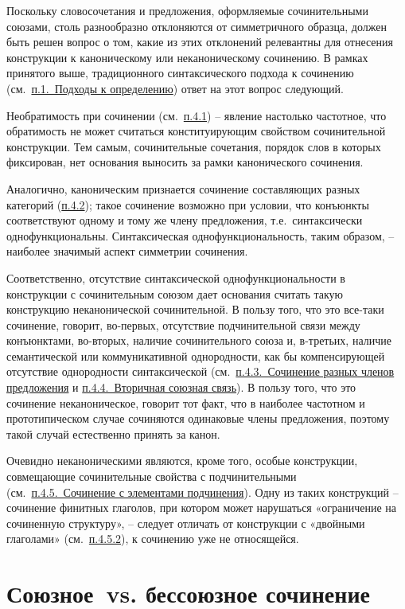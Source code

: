 Поскольку словосочетания и предложения, оформляемые сочинительными
союзами, столь разнообразно отклоняются от симметричного образца, должен
быть решен вопрос о том, какие из этих отклонений релевантны для
отнесения конструкции к каноническому или неканоническому сочинению. В
рамках принятого выше, традиционного синтаксического подхода к сочинению
(см.~\underline{п.1.~Подходы к определению}) ответ на этот вопрос
следующий.

Необратимость при сочинении (см.~\underline{п.4.1}) -- явление настолько
частотное, что обратимость не может считаться конституирующим свойством
сочинительной конструкции. Тем самым, сочинительные сочетания, порядок
слов в которых фиксирован, нет основания выносить за рамки канонического
сочинения.

Аналогично, каноническим признается сочинение составляющих разных
категорий (\underline{п.4.2}); такое сочинение возможно при условии, что
конъюнкты соответствуют одному и тому же члену предложения,
т.е.~синтаксически однофункциональны. Синтаксическая
однофункциональность, таким образом, -- наиболее значимый аспект
симметрии сочинения.

Соответственно, отсутствие синтаксической однофункциональности в
конструкции с сочинительным союзом дает основания считать такую
конструкцию неканонической сочинительной. В пользу того, что это
все-таки сочинение, говорит, во-первых, отсутствие подчинительной связи
между конъюнктами, во-вторых, наличие сочинительного союза и, в-третьих,
наличие семантической или коммуникативной однородности, как бы
компенсирующей отсутствие однородности синтаксической
(см.~\underline{п.4.3.~Сочинение разных членов предложения} и
\underline{п.4.4.~Вторичная союзная связь}). В пользу того, что это
сочинение неканоническое, говорит тот факт, что в наиболее частотном и
прототипическом случае сочиняются одинаковые члены предложения, поэтому
такой случай естественно принять за канон.

Очевидно неканоническими являются, кроме того, особые конструкции,
совмещающие сочинительные свойства с подчинительными
(см.~\underline{п.4.5.~Сочинение с элементами подчинения}). Одну из
таких конструкций -- сочинение финитных глаголов, при котором может
нарушаться «ограничение на сочиненную структуру», -- следует отличать от
конструкции с «двойными глаголами» (см.~\underline{п.4.5.2}), к
сочинению уже не относящейся.

\hypertarget{ux441ux43eux44eux437ux43dux43eux435-vs.-ux431ux435ux441ux441ux43eux44eux437ux43dux43eux435-ux441ux43eux447ux438ux43dux435ux43dux438ux435}{%
\section{Союзное~vs. бессоюзное
сочинение}\label{ux441ux43eux44eux437ux43dux43eux435-vs.-ux431ux435ux441ux441ux43eux44eux437ux43dux43eux435-ux441ux43eux447ux438ux43dux435ux43dux438ux435}}

